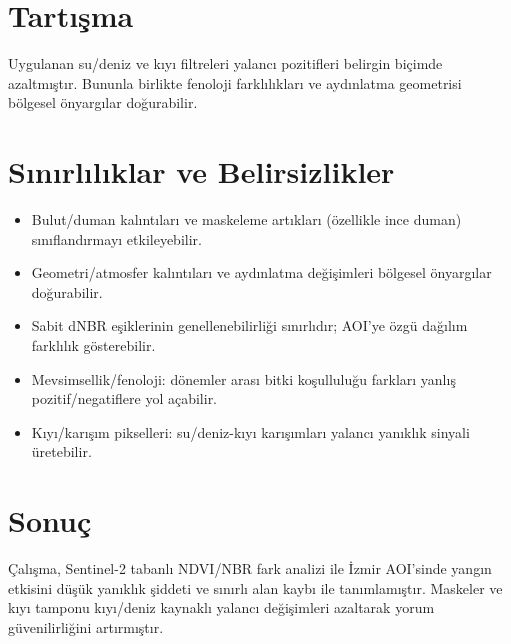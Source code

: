 \documentclass[11pt,a4paper]{article}
\begin{document}
\section{Tartışma}
Uygulanan su/deniz ve kıyı filtreleri yalancı pozitifleri belirgin biçimde azaltmıştır. Bununla birlikte fenoloji farklılıkları ve aydınlatma geometrisi bölgesel önyargılar doğurabilir. 

\section{Sınırlılıklar ve Belirsizlikler}
\begin{itemize}
  \item Bulut/duman kalıntıları ve maskeleme artıkları (özellikle ince duman) sınıflandırmayı etkileyebilir.
  \item Geometri/atmosfer kalıntıları ve aydınlatma değişimleri bölgesel önyargılar doğurabilir.
  \item Sabit dNBR eşiklerinin genellenebilirliği sınırlıdır; AOI'ye özgü dağılım farklılık gösterebilir.
  \item Mevsimsellik/fenoloji: dönemler arası bitki koşulluluğu farkları yanlış pozitif/negatiflere yol açabilir.
  \item Kıyı/karışım pikselleri: su/deniz-kıyı karışımları yalancı yanıklık sinyali üretebilir.
\end{itemize}
\section{Sonuç}
Çalışma, Sentinel-2 tabanlı NDVI/NBR fark analizi ile İzmir AOI'sinde yangın etkisini düşük yanıklık şiddeti ve sınırlı alan kaybı ile tanımlamıştır. Maskeler ve kıyı tamponu kıyı/deniz kaynaklı yalancı değişimleri azaltarak yorum güvenilirliğini artırmıştır. 
\end{document}
